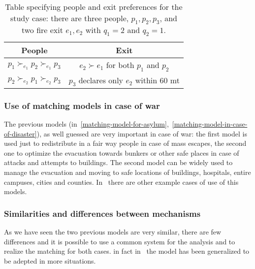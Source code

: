 \documentclass[letterpaper]{article} %
\begin{document}
    \begin{table}[!htb]
        \begin{tabular}{c|c}
            \hline People                                             & Exit                                                       \\
            \hline\( p_{1} \succ_{e_{1}} p_{2} \succ_{e_{1}} p_{3} \) & \( e_{2} \succ e_{1} \) for both \( p_{1} \) and \( p_{2} \) \\
            \( p_{2} \succ_{e_{2}} p_{1} \succ_{e_{2}} p_{3} \)       & \( p_{3} \) declares only \( e_{2} \) within 60 mt         \\
            \hline
        \end{tabular}
        \caption{Table specifying people and exit preferences for
            the study case: there are three people, \( p _ { 1 } , p _ { 2 } , p _ { 3 } \), and two fire exit
            \( e _ { 1 } , e _ { 2 } \) with \( q _ { 1 } = 2 \) and \( q _ { 2 } = 1 \).}
        \label{tab:people-exit}
    \end{table}

    \subsubsection{Use of matching models in case of war}\label{use-of-matching-model-in-case-of-war}%
    The previous models (in~\ref{matching-model-for-asylum},~\ref{matching-model-in-case-of-disaster}), as well guessed are very important in case of war: the first model is used just
    to redistribute in a fair way people in case of mass escapes, the second one to optimize the evacuation
    towards bunkers or other safe places in case of attacks and attempts to buildings.
    The second model can be widely used to manage the evacuation and moving to safe locations of buildings, hospitals,
    entire campuses, cities and counties.
    In~\citet{delacretaz_2020,delacretaz_2019,delacretaz_2016}   there are other example cases of use of this models.

    \subsubsection{Similarities and differences between mechanisms}

    As we have seen the two previous models are very similar, there are few differences and it is possible to use a
    common system for the analysis and to realize the matching for both cases.
    in fact in~\citet{delacretaz_2020} the model has been generalized to be adepted in more situations.
\end{document}
